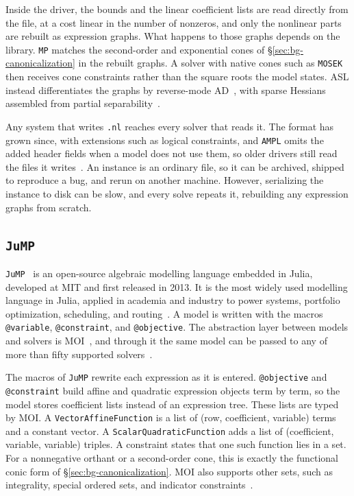 Inside the driver, the bounds and the linear coefficient lists are read directly from the file,
at a cost linear in the number of nonzeros, and only the nonlinear parts are rebuilt as
expression graphs. What happens to those graphs depends on the library. \texttt{MP} matches
the second-order and exponential cones of \S\ref{sec:bg-canonicalization} in the rebuilt
graphs. A solver with native cones such as
\texttt{MOSEK} then receives cone constraints rather than the square roots the model states.
ASL instead differentiates the graphs by reverse-mode AD~\cite{gay1991automatic},
with sparse Hessians assembled from partial separability~\cite{gay1996more}.

Any system that writes \texttt{.nl} reaches every solver that reads it. The format has grown
since, with extensions such as logical constraints, and \texttt{AMPL} omits the added header
fields when a model does not use them, so older drivers still read the files it
writes~\cite{gay2005writing}. An instance is an ordinary file, so it can be archived, shipped to
reproduce a bug, and rerun on another machine.
However, serializing the instance to disk can be slow, and every solve repeats it, rebuilding
any expression graphs from scratch.

\subsection{\texttt{JuMP}}
\label{sec:jump}

\texttt{JuMP}~\cite{dunning2017jump, lubin2023jump10recent} is an open-source algebraic
modelling language embedded in Julia, developed at MIT and first released in 2013. It is the
most widely used modelling language in Julia, applied in academia and industry to power
systems, portfolio optimization, scheduling, and routing~\cite{lubin2023jump10recent}.
A model is written with the macros
\texttt{@variable}, \texttt{@constraint}, and \texttt{@objective}. The abstraction layer
between models and solvers is \ac{MOI}~\cite{legat2020mathoptinterface}, and through it the
same model can be passed to any of more than fifty supported solvers~\cite{jumpdocs}.

The macros of \texttt{JuMP} rewrite each expression as it is entered. \texttt{@objective} and
\texttt{@constraint} build affine and quadratic expression objects term by term, so the model
stores coefficient lists instead of an expression tree. These lists are typed by \ac{MOI}. A
\texttt{VectorAffineFunction} is a list of (row, coefficient, variable) terms and a constant
vector. A \texttt{ScalarQuadraticFunction} adds a list of (coefficient, variable, variable)
triples. A constraint states that one such function lies in a set. For a nonnegative orthant
or a second-order cone, this is exactly the functional conic form
of \S\ref{sec:bg-canonicalization}. MOI also supports other sets, such as integrality,
special ordered sets, and indicator constraints~\cite{moidocs}.

